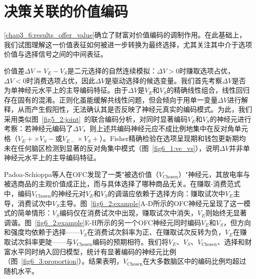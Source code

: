 \section{决策关联的价值编码}\label{chap3_7:results_choice_value}

\ref{chap3_6:results_offer_value}确立了财富对价值编码的调制作用。在此基础上，我们试图理解这一价值表征如何被进一步转换为最终选择，尤其关注其中介于选项价值与选择信号之间的中间表征。

价值差$\Delta V = V_E - V_S$是二元选择的自然连续模拟：$\Delta V > 0$时赚取选项占优，$\Delta V < 0$时消费选项占优，因此$\Delta V$是驱动选择的候选变量。我们首先考察$\Delta V$是否为单神经元水平上的主导编码特征。由于$\Delta V$是$V_E$和$V_S$的精确线性组合，线性回归存在固有的混淆。正则化虽能缓解共线性问题，但会倾向于用单一变量$\Delta V$进行解释，从而产生假阳性，无法确认其是否反映了神经元真实的编码模式。为此，我们采用类似图~\ref{fig5_2:joint}~的联合编码分析，对同时显著编码$V_E$和$V_S$的神经元进行考察：若神经元编码了$\Delta V$，则上述共编码神经元应不成比例地集中在反对角单元格（$V_{E}+ \times V_{S}-$或$V_{E-} \times V_{S}+$）。Fisher精确检验在选项呈现期和钱包更新期均未在任何脑区检测到显著的反对角集中模式（图~\ref{fig6_1:ve_vs}），说明$\Delta V$并非单神经元水平上的主导编码特征。

Padoa-Schioppa等人\citep{padoaschioppa2006neurons}在OFC发现了一类"被选价值（$V_{\mathrm{Chosen}}$）"神经元，其放电率与被选商品的主观价值成正比，而与具体选择了哪种商品无关。在赚取-消费范式中，编码$V_\mathrm{Chosen}$的神经元对$V_E$和$V_S$的调谐应依赖于选择方向：赚取试次中$V_E$主导，消费试次中$V_S$主导。图~\ref{fig6_2:example}A-D所示的OFC神经元呈现了这一模式的简单情形：$V_S$编码仅在消费试次中出现，赚取试次中消失，$V_E$则始终无显著调谐。图~\ref{fig6_2:example}E-H所示的另一个OFC神经元同时编码$V_E$和$V_S$，但方向和强度均依赖于选择——$V_S$在消费试次斜率为正、在赚取试次反转为负，$V_E$在赚取试次斜率更陡——与$V_\mathrm{Chosen}$编码的预期相符。我们将$V_E$、$V_S$、$V_\mathrm{Chosen}$、选择和财富水平同时纳入回归模型，统计有显著编码的神经元比例（图~\ref{fig6_3:proportion}）。结果表明，$V_\mathrm{Chosen}$在大多数脑区中的编码比例均超过随机水平。

